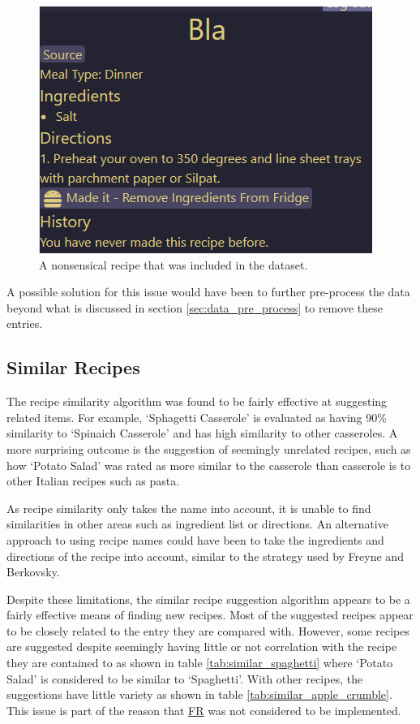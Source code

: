 \begin{figure}
    \centering
    \caption{\label{fig:bad_recipe_entry}A nonsensical recipe that was included in the dataset.}
    \includegraphics[scale=0.75]{figures/bad_recipe_entry.png}
\end{figure}

A possible solution for this issue would have been to further pre-process the
data beyond what is discussed in section \ref{sec:data_pre_process} to remove
these entries.

\subsection{Similar Recipes}

The recipe similarity algorithm was found to be fairly effective at suggesting related items.
For example, \enquote*{Sphagetti Casserole} is evaluated as having 90\% similarity to
\enquote*{Spinaich Casserole} and has high similarity to other casseroles. A more surprising
outcome is the suggestion of seemingly unrelated recipes, such as how \enquote*{Potato Salad}
was rated as more similar to the casserole than casserole is to other Italian recipes such as
pasta.

As recipe similarity only takes the name into account, it is unable to find similarities
in other areas such as ingredient list or directions. An alternative approach to using
recipe names could have been to take the ingredients and directions of the recipe into account,
similar to the strategy used by Freyne and Berkovsky.~\cite{freyne_intelligent_2010}

Despite these limitations, the similar recipe suggestion algorithm appears to be a fairly effective
means of finding new recipes. Most of the suggested recipes appear to be closely related to the entry they are
compared with. However, some recipes are suggested despite seemingly having little or not correlation with the
recipe they are contained to as shown in table \ref{tab:similar_spaghetti} where \enquote*{Potato Salad} is considered
to be similar to \enquote*{Spaghetti}. With other recipes, the suggestions have little variety as shown in table
\ref{tab:similar_apple_crumble}. This issue is part of the reason that
\hyperref[req:too_similar]{FR} was not considered to be implemented.

